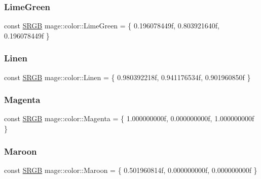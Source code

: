 \subsubsection{\texorpdfstring{Lime\+Green}{LimeGreen}}
{\footnotesize\ttfamily const \hyperlink{structmage_1_1_s_r_g_b}{S\+R\+GB} mage\+::color\+::\+Lime\+Green = \{ 0.\+196078449f, 0.\+803921640f, 0.\+196078449f \}}

\hypertarget{namespacemage_1_1color_a3804411acfe7c2e8567f61ebe7f40522}{}\label{namespacemage_1_1color_a3804411acfe7c2e8567f61ebe7f40522} 
\subsubsection{\texorpdfstring{Linen}{Linen}}
{\footnotesize\ttfamily const \hyperlink{structmage_1_1_s_r_g_b}{S\+R\+GB} mage\+::color\+::\+Linen = \{ 0.\+980392218f, 0.\+941176534f, 0.\+901960850f \}}

\hypertarget{namespacemage_1_1color_af421aa7734e092e59d0bab49ea55e507}{}\label{namespacemage_1_1color_af421aa7734e092e59d0bab49ea55e507} 
\subsubsection{\texorpdfstring{Magenta}{Magenta}}
{\footnotesize\ttfamily const \hyperlink{structmage_1_1_s_r_g_b}{S\+R\+GB} mage\+::color\+::\+Magenta = \{ 1.\+000000000f, 0.\+000000000f, 1.\+000000000f \}}

\hypertarget{namespacemage_1_1color_ad8905eb70dd62d46ffdbb2ff95950b49}{}\label{namespacemage_1_1color_ad8905eb70dd62d46ffdbb2ff95950b49} 
\subsubsection{\texorpdfstring{Maroon}{Maroon}}
{\footnotesize\ttfamily const \hyperlink{structmage_1_1_s_r_g_b}{S\+R\+GB} mage\+::color\+::\+Maroon = \{ 0.\+501960814f, 0.\+000000000f, 0.\+000000000f \}}

\hypertarget{namespacemage_1_1color_a0fb4af052581f1f5ec11f55c8f34a358}{}\label{namespacemage_1_1color_a0fb4af052581f1f5ec11f55c8f34a358} 
